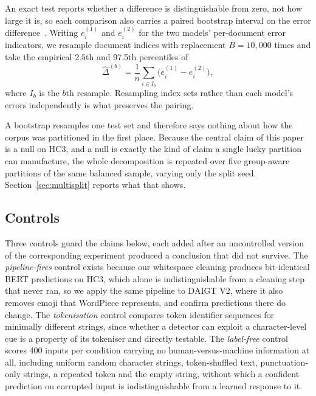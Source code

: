 \documentclass[conference,a4paper]{IEEEtran}
\begin{document}
An exact test reports whether a difference is distinguishable from zero, not how large it is, so each comparison also carries a paired bootstrap interval on the error difference~\cite{Efron1979bootstrap}. Writing $e^{(1)}_i$ and $e^{(2)}_i$ for the two models' per-document error indicators, we resample document indices with replacement $B=10{,}000$ times and take the empirical 2.5th and 97.5th percentiles of
\begin{equation}
\label{eq:boot}
\hat{\Delta}^{(b)}  =  \frac{1}{n}\sum_{i \in I_b}\Big(e^{(1)}_i - e^{(2)}_i\Big),
\end{equation}
where $I_b$ is the $b$th resample. Resampling index sets rather than each model's errors independently is what preserves the pairing.

A bootstrap resamples one test set and therefore says nothing about how the corpus was partitioned in the first place. Because the central claim of this paper is a null on HC3, and a null is exactly the kind of claim a single lucky partition can manufacture, the whole decomposition is repeated over five group-aware partitions of the same balanced sample, varying only the split seed. Section~\ref{sec:multisplit} reports what that shows.

\subsection{Controls}
\label{sec:controls}

Three controls guard the claims below, each added after an uncontrolled version of the corresponding experiment produced a conclusion that did not survive. The \emph{pipeline-fires} control exists because our whitespace cleaning produces bit-identical BERT predictions on HC3, which alone is indistinguishable from a cleaning step that never ran, so we apply the same pipeline to DAIGT V2, where it also removes emoji that WordPiece represents, and confirm predictions there do change. The \emph{tokenisation} control compares token identifier sequences for minimally different strings, since whether a detector can exploit a character-level cue is a property of its tokeniser and directly testable. The \emph{label-free} control scores 400 inputs per condition carrying no human-versus-machine information at all, including uniform random character strings, token-shuffled text, punctuation-only strings, a repeated token and the empty string, without which a confident prediction on corrupted input is indistinguishable from a learned response to it.
\end{document}
